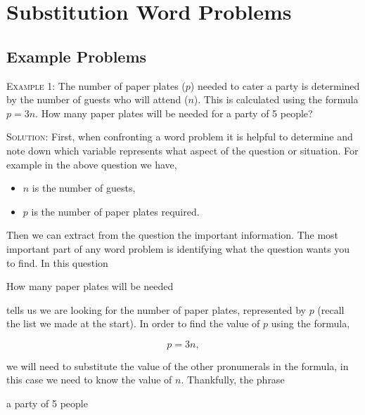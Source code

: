 \documentclass[a4paper,12pt]{article}
\begin{document}
\large
\section*{Substitution Word Problems}

\subsection*{Example Problems}


\textsc{Example 1}: The number of paper plates ($p$) needed to cater a
party is determined by the number of guests who will attend ($n$). This
is calculated using the formula $p = 3n$. How many paper plates 
will be needed for a party of 5 people?

\textsc{Solution}: First, when confronting a word problem 
it is helpful to determine and note down which variable 
represents what aspect of the question or situation. 
For example in the above question we have,

\begin{itemize}
\item $n$ is the number of guests,
\item $p$ is the number of paper plates required.
\end{itemize}

Then we can extract from the question the important
information. The most important part of any word problem
is identifying what the question wants you to find. In this 
question

\begin{displayquote}
How many paper plates will be needed
\end{displayquote}

tells us we are looking for the number of paper plates, 
represented by $p$ (recall the list we made at the start).
In order to find the value of $p$ using the formula,

$$p = 3n,$$

we will need to substitute the value of the other pronumerals in 
the formula, in this case we need to know the value of $n$. 
Thankfully, the phrase

\begin{displayquote}
a party of 5 people
\end{displayquote}
\end{document}
